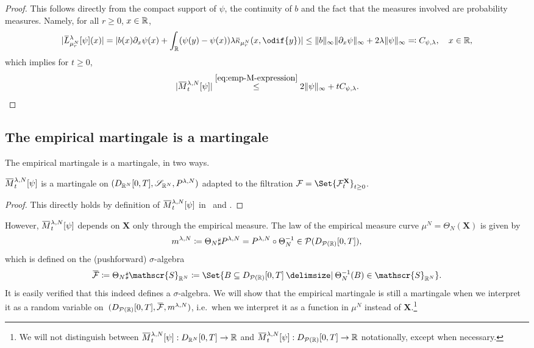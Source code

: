 \begin{proof}
  This follows directly from the compact support of \( \psi \), the continuity of \( b \) and the fact that the measures involved are probability measures.
  Namely, for all \( r \geq 0 \), \( x \in \mathbb{R} \),
  \begin{equation}
    \abs{ \ol{L}_{\mu_{r}^N}^{\lambda} [\psi](x) }
    = \abs{ b(x) \partial_x \psi(x) + \int_\potspace (\psi(y) - \psi(x)) \lambda \ol{\kappa}_{\mu_{r}^N}(x, \odif{y}) }
    \leq \norm{b}_\infty \norm{\partial_x \psi}_\infty + 2 \lambda \norm{\psi}_\infty
    \eqqcolon C_{\psi, \lambda}, \quad x \in \potspace,
  \end{equation}
  which implies for \( t \geq 0 \),
  \begin{equation}
    \abs{ \ol{M}_t^{\lambda, N}[\psi] }
    \overset{\eqref{eq:emp-M-expression}}{\leq} 2 \norm{\psi}_\infty + t C_{\psi, \lambda}.
  \end{equation}
\end{proof}

\subsection{The empirical martingale is a martingale}

The empirical martingale is a martingale, in two ways.
\begin{corollary}\label{cor:easy-emp-M-mart}
  \(\ol{M}_t^{\lambda,N}[\psi]\) is a martingale on \((D_{\mathbb{R}^N}[0,T], \mathscr{S}_{\mathbb{R}^N}, P^{\lambda, N})\) adapted to the filtration \( \cF = \Set{\cF_t^\bm{X}}_{t\geq0} \).
\end{corollary}
\begin{proof}
  This directly holds by definition of \( \ol{M}_t^{\lambda,N}[\psi] \) in~ and .
\end{proof}

However, \(\ol{M}_t^{\lambda,N}[\psi]\) depends on \( \bm{X} \) only through the empirical measure.
The law of the empirical measure curve \(\mu^N = \Theta_N(\bm{X})\) is given by
\begin{equation}
  m^{\lambda,N} \coloneqq \Theta_N \sharp P^{\lambda, N} = P^{\lambda, N} \circ \Theta_N^{-1} \in \mathcal{P}(D_{\mathcal{P}(\mathbb{R})}[0,T]),
\end{equation}
which is defined on the (pushforward) \( \sigma \)-algebra
\begin{equation}
  \ol{\cF} \coloneqq \Theta_N \sharp \mathscr{S}_{\potspace^N} \coloneqq \Set{B \subseteq D_{\cP(\potspace)}[0,T] \given \Theta_N^{-1}(B) \in \mathscr{S}_{\potspace^N}}.
\end{equation}
It is easily verified that this indeed defines a \( \sigma \)-algebra.
We will show that the empirical martingale is still a martingale when we interpret it as a random variable on~\((D_{\cP(\potspace)}[0,T], \ol{\cF}, \lawmu^{\lambda,N})\), i.e.\ when we interpret it as a function in \(\mu^N\) instead of \(\bm{X}\).\footnote{We will not distinguish between \( \ol{M}_t^{\lambda,N}[\psi] :  D_{\potspace^N}[0,T] \to \bR \) and \( \ol{M}_t^{\lambda,N}[\psi] :  D_{\cP(\potspace)}[0,T] \to \bR \) notationally, except when necessary.}

